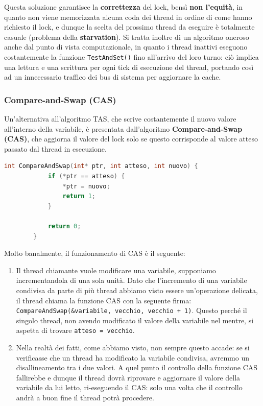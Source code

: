 \documentclass[12pt]{report}
\begin{document}
	Questa soluzione garantisce la \textbf{correttezza} del lock, bensì \textbf{non l'equità}, in quanto non viene memorizzata alcuna coda dei thread in ordine di come hanno richiesto il lock, e dunque la scelta del prossimo thread da eseguire è totalmente casuale (problema della \textbf{starvation}). Si tratta inoltre di un algoritmo oneroso anche dal punto di vista computazionale, in quanto i thread inattivi eseguono costantemente la funzione \texttt{TestAndSet()} fino all'arrivo del loro turno: ciò implica una lettura e una scrittura per ogni tick di esecuzione del thread, portando così ad un innecessario traffico dei bus di sistema per aggiornare la cache.
	
	\subsubsection*{Compare-and-Swap (CAS)}
	Un'alternativa all'algoritmo TAS, che scrive costantemente il nuovo valore all'interno della variabile, è presentata dall'algoritmo \textbf{Compare-and-Swap (CAS)}, che aggiorna il valore del lock solo se questo corrisponde al valore atteso passato dal thread in esecuzione.
	\begin{lstlisting}[language=C]
		int CompareAndSwap(int* ptr, int atteso, int nuovo) {
			if (*ptr == atteso) {
				*ptr = nuovo;
				return 1;
			}
			
			return 0;
		}
	\end{lstlisting}
	Molto banalmente, il funzionamento di CAS è il seguente:
	\begin{enumerate}
		\item Il thread chiamante vuole modificare una variabile, supponiamo incrementandola di una sola unità. Dato che l'incremento di una variabile condivisa da parte di più thread abbiamo visto essere un'operazione delicata, il thread chiama la funzione CAS con la seguente firma: \texttt{CompareAndSwap(\&variabile, vecchio, vecchio + 1)}. Questo perché il singolo thread, non avendo modificato il valore della variabile nel mentre, si aspetta di trovare \texttt{atteso = vecchio}.
		
		\item Nella realtà dei fatti, come abbiamo visto, non sempre questo accade: se si verificasse che un thread ha modificato la variabile condivisa, avremmo un disallineamento tra i due valori. A quel punto il controllo della funzione CAS fallirebbe e dunque il thread dovrà riprovare e aggiornare il valore della variabile da lui letto, ri-eseguendo il CAS: solo una volta che il controllo andrà a buon fine il thread potrà procedere.
	\end{enumerate}
\end{document}
